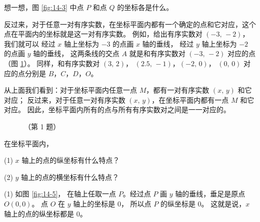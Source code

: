 想一想，图 \ref{fig:14-3} 中点 $P$ 和点 $Q$ 的坐标各是什么。

\begin{figure}[htbp]
  \centering
  \begin{minipage}{6cm}
  \centering
  
  \caption{}\label{fig:14-3}
  \end{minipage}
  \qquad
  \begin{minipage}{8cm}
  \centering
  
  \caption{}\label{fig:14-4}
  \end{minipage}
\end{figure}

反过来，对于任意一对有序实数，在坐标平面内都有一个确定的点和它对应，这个点在平面内的坐标就是这一对有序实数。
例如，给出有序实数对 $(-3,\, -2)$，我们就可以
经过 $x$ 轴上坐标为 $-3$ 的点画 $x$ 轴的垂线，
经过 $y$ 轴上坐标为 $-2$ 的点画 $y$ 轴的垂线，
这两条线的交点 $A$ 就是和有序实数对 $(-3,\, -2)$ 对应的点（图 \ref{fig:14-4}）。
同样，和有序实数对 $(3,\, 2)$， $(2.5,\, -1)$，$(-2,\, 0)$， $(0,\, 0)$ 对应的点分别是 $B$，$C$，$D$，$O$。

从上面我们看到：对于坐标平面内任意一点 $M$，都有一对有序实数 $(x,\, y)$ 和它对应；
反过来，对于任意一对有序实数 $(x,\, y)$，在坐标平面内都有一点 $M$ 和它对应。
因此，坐标平面内所有的点与所有有序实数对之间是一一对应的。


\lianxi
\begin{xiaotis}


\begin{figure}[htbp]
  \centering
  
  \caption*{（第 1 题）}
\end{figure}



\end{xiaotis}
\lianxijiange


\liti 在坐标平面内，

(1) $x$ 轴上的点的纵坐标有什么特点？

(2) $y$ 轴上的点的横坐标有什么特点？

\jie (1) 如图 \ref{fig:14-5}， 在轴上任取一点 $P$。经过点 $P$ 画 $y$ 轴的垂线，垂足是原点 $O(0, 0)$。
点 $O$ 在 $y$ 轴上的坐标是 $0$， 所以点 $P$ 的纵坐标是 $0$。
这就是说，$x$ 轴上的点的纵坐标都是 $0$。

